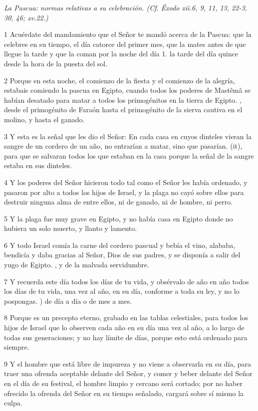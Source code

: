 \par \textit{La Pascua: normas relativas a su celebración. (Cf. Éxodo xii.6, 9, 11, 13, 22-3, 30, 46; xv.22.)}

\par 1 Acuérdate del mandamiento que el Señor te mandó acerca de la Pascua: que la celebres en su tiempo, el día catorce del primer mes, que la mates antes de que llegue la tarde y que la coman por la noche del día 1. la tarde del día quince desde la hora de la puesta del sol.
\par 2 Porque en esta noche, el comienzo de la fiesta y el comienzo de la alegría, estabais comiendo la pascua en Egipto, cuando todos los poderes de Mastêmâ se habían desatado para matar a todos los primogénitos en la tierra de Egipto. , desde el primogénito de Faraón hasta el primogénito de la sierva cautiva en el molino, y hasta el ganado.
\par 3 Y esta es la señal que les dio el Señor: En cada casa en cuyos dinteles vieran la sangre de un cordero de un año, no entrarían a matar, sino que pasarían. (it), para que se salvaran todos los que estaban en la casa porque la señal de la sangre estaba en sus dinteles.
\par 4 Y los poderes del Señor hicieron todo tal como el Señor les había ordenado, y pasaron por alto a todos los hijos de Israel, y la plaga no cayó sobre ellos para destruir ninguna alma de entre ellos, ni de ganado, ni de hombre, ni perro.
\par 5 Y la plaga fue muy grave en Egipto, y no había casa en Egipto donde no hubiera un solo muerto, y llanto y lamento.
\par 6 Y todo Israel comía la carne del cordero pascual y bebía el vino, alababa, bendicía y daba gracias al Señor, Dios de sus padres, y se disponía a salir del yugo de Egipto. , y de la malvada servidumbre.
\par 7 Y recuerda este día todos los días de tu vida, y obsérvalo de año en año todos los días de tu vida, una vez al año, en su día, conforme a toda su ley, y no lo pospongas. ) de día a día o de mes a mes.
\par 8 Porque es un precepto eterno, grabado en las tablas celestiales, para todos los hijos de Israel que lo observen cada año en su día una vez al año, a lo largo de todas sus generaciones; y no hay límite de días, porque esto está ordenado para siempre.
\par 9 Y el hombre que está libre de impureza y no viene a observarla en su día, para traer una ofrenda aceptable delante del Señor, y comer y beber delante del Señor en el día de su festival, el hombre limpio y cercano será cortado; por no haber ofrecido la ofrenda del Señor en su tiempo señalado, cargará sobre sí mismo la culpa.
